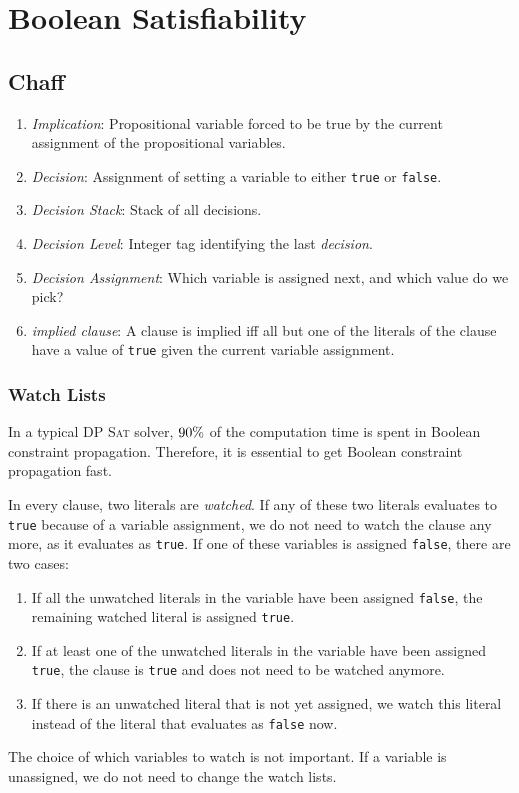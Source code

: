 \chapter{Boolean Satisfiability}

\section{Chaff}

\begin{enumerate}
\item \emph{Implication}: Propositional variable forced to be true by the current assignment of the
      propositional variables.
\item \emph{Decision}: Assignment of setting a variable to either \texttt{true} or \texttt{false}.
\item \emph{Decision Stack}: Stack of all decisions.
\item \emph{Decision Level}: Integer tag identifying the last \emph{decision}.
\item \emph{Decision Assignment}: Which variable is assigned next, and which value do we pick?
\item \emph{implied clause}: A clause is implied iff all but one of the literals of the clause have
      a value of \texttt{true} given the current variable assignment.
\end{enumerate}

\subsection{Watch Lists}
In a typical DP \textsc{Sat} solver, $90\symbol{37}$ of the computation time is spent in Boolean
constraint propagation.  Therefore, it is essential to get Boolean constraint propagation fast.
 
In every clause, two literals are \emph{watched}.  If any of these two literals evaluates to \texttt{true}
because of a variable assignment, we do not need to watch the clause any more, as it evaluates as 
\texttt{true}.  If one of these variables is assigned \texttt{false}, there are two cases:
\begin{enumerate}
\item If all the unwatched literals in the variable have been assigned 
      \texttt{false}, the remaining watched literal is assigned \texttt{true}.
\item If at least one of the unwatched literals in the variable have been assigned 
      \texttt{true}, the clause is \texttt{true} and does not need to be watched anymore.
\item If there is an unwatched literal that is not yet assigned, we watch this literal instead of
      the literal that evaluates as \texttt{false} now.
\end{enumerate}
The choice of which variables to watch is not important.  If a variable is unassigned, we do not
need to change the watch lists.


